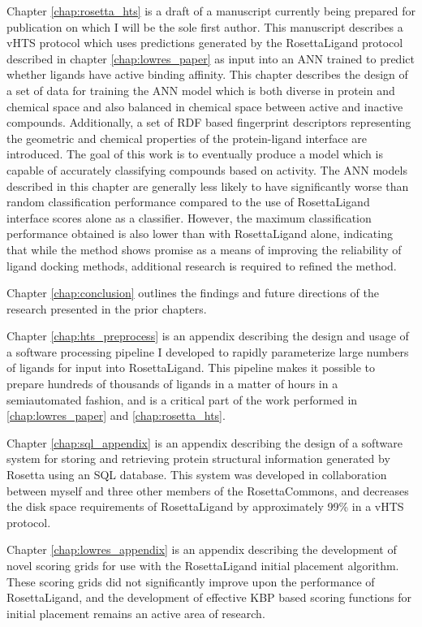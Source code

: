 Chapter \ref{chap:rosetta_hts} is a draft of a manuscript currently being prepared for publication on which I will be the sole first author.
This manuscript describes a \ac{vHTS} protocol which uses predictions generated by the RosettaLigand protocol described in chapter \ref{chap:lowres_paper} as input into an \ac{ANN} trained to predict whether ligands have active binding affinity.
This chapter describes the design of a set of data for training the \ac{ANN} model which is both diverse in protein and chemical space and also balanced in chemical space between active and inactive compounds.
Additionally, a set of \ac{RDF} based fingerprint descriptors representing the geometric and chemical properties of the protein-ligand interface are introduced.
The goal of this work is to eventually produce a model which is capable of accurately classifying compounds based on activity.
The \ac{ANN} models described in this chapter are generally less likely to have significantly worse than random classification performance compared to the use of RosettaLigand interface scores alone as a classifier.
However, the maximum classification performance obtained is also lower than with RosettaLigand alone, indicating that while the method shows promise as a means of improving the reliability of ligand docking methods, additional research is required to refined the method.

Chapter \ref{chap:conclusion} outlines the findings and future directions of the research presented in the prior chapters.

Chapter \ref{chap:hts_preprocess} is an appendix describing the design and usage of a software processing pipeline I developed to rapidly parameterize large numbers of ligands for input into RosettaLigand.
This pipeline makes it possible to prepare hundreds of thousands of ligands in a matter of hours in a semiautomated fashion, and is a critical part of the work performed in \ref{chap:lowres_paper} and \ref{chap:rosetta_hts}.

Chapter \ref{chap:sql_appendix} is an appendix describing the design of a software system for storing and retrieving protein structural information generated by Rosetta using an \ac{SQL} database.
This system was developed in collaboration between myself and three other members of the RosettaCommons, and decreases the disk space requirements of RosettaLigand by approximately 99\% in a \ac{vHTS} protocol.

Chapter \ref{chap:lowres_appendix} is an appendix describing the development of novel scoring grids for use with the RosettaLigand initial placement algorithm.
These scoring grids did not significantly improve upon the performance of RosettaLigand, and the development of effective \ac{KBP} based scoring functions for initial placement remains an active area of research. 

